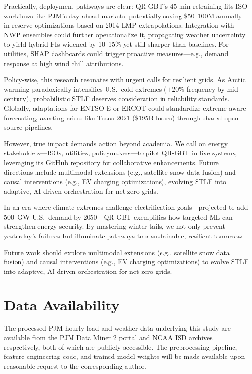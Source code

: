 \documentclass[12pt,a4paper]{article}
\begin{document}
Practically, deployment pathways are clear: QR-GBT's 45-min retraining fits ISO workflows like PJM's day-ahead markets, potentially saving \$50--100M annually in reserve optimizations based on 2014 LMP extrapolations. Integration with NWP ensembles could further operationalize it, propagating weather uncertainty to yield hybrid PIs widened by 10--15\% yet still sharper than baselines. For utilities, SHAP dashboards could trigger proactive measures---e.g., demand response at high wind chill attributions.

Policy-wise, this research resonates with urgent calls for resilient grids. As Arctic warming paradoxically intensifies U.S.\ cold extremes ($+$20\% frequency by mid-century), probabilistic STLF deserves consideration in reliability standards. Globally, adaptations for ENTSO-E or ERCOT could standardize extreme-aware forecasting, averting crises like Texas 2021 (\$195B losses) through shared open-source pipelines.

However, true impact demands action beyond academia. We call on energy stakeholders---ISOs, utilities, policymakers---to pilot QR-GBT in live systems, leveraging its GitHub repository for collaborative enhancements. Future directions include multimodal extensions (e.g., satellite snow data fusion) and causal interventions (e.g., EV charging optimizations), evolving STLF into adaptive, AI-driven orchestration for net-zero grids.

In an era where climate extremes challenge electrification goals---projected to add 500~GW U.S.\ demand by 2050---QR-GBT exemplifies how targeted ML can strengthen energy security. By mastering winter tails, we not only prevent yesterday's failures but illuminate pathways to a sustainable, resilient tomorrow.

Future work should explore multimodal extensions (e.g., satellite snow data fusion) and causal interventions (e.g., EV charging optimizations) to evolve STLF into adaptive, AI-driven orchestration for net-zero grids.

\section{Data Availability}
\label{sec:dataavailability}

The processed PJM hourly load and weather data underlying this study are available from the PJM Data Miner 2 portal and NOAA ISD archives respectively, both of which are publicly accessible. The preprocessing pipeline, feature engineering code, and trained model weights will be made available upon reasonable request to the corresponding author.
\end{document}
